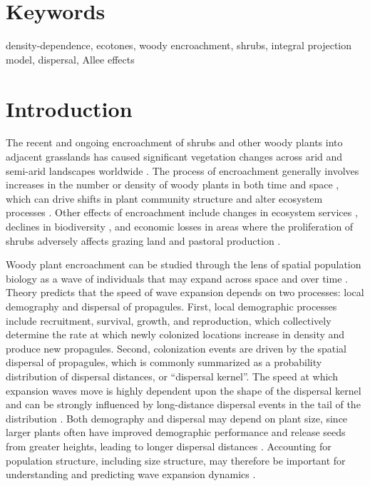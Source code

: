 \documentclass[11pt]{article}\usepackage[]{graphicx}\usepackage[usenames,dvipsnames]{xcolor}
\begin{document}
\section*{Keywords}

density-dependence, ecotones, woody encroachment, shrubs, integral projection model, dispersal, Allee effects

\newpage
\section*{Introduction}
The recent and ongoing encroachment of shrubs and other woody plants into adjacent grasslands has caused significant vegetation changes across arid and semi-arid landscapes worldwide \citep{van2000shrub, van2009causes, goslee2003high, gibbens2005vegetation,parizek2002soil, cabral2003shrub,trollope1989encroachment, roques2001dynamics}.
The process of encroachment generally involves increases in the number or density of woody plants in both time and space \citep{van2000shrub}, which can drive shifts in plant community structure and alter ecosystem processes \citep{schlesinger1990biological, ravi2009can,schlesinger1998plant, knapp2008shrub}.
Other effects of encroachment include changes in ecosystem services \citep{reed2015reorienting, kelleway2017review}, declines in biodiversity \citep{ratajczak2012woody, sirami2012changes, brandt2013regime}, and economic losses in areas where the proliferation of shrubs adversely affects grazing land and pastoral production \citep{mugasi2000economic, oba2000bush}.

Woody plant encroachment can be studied through the lens of spatial population biology as a wave of individuals that may expand across space and over time \citep{kot1996dispersal, neubert2000demography, wang2002integrodifference, pan2012invasion}.
Theory predicts that the speed of wave expansion depends on two processes: local demography and dispersal of propagules.
First, local demographic processes include recruitment, survival, growth, and reproduction, which collectively determine the rate at which newly colonized locations increase in density and produce new propagules. 
Second, colonization events are driven by the spatial dispersal of propagules, which is commonly summarized as a probability distribution of dispersal distances, or ``dispersal kernel''.
The speed at which expansion waves move is highly dependent upon the shape of the dispersal kernel and can be strongly influenced by long-distance dispersal events in the tail of the distribution \citep{skarpaas2007dispersal}.
Both demography and dispersal may depend on plant size, since larger plants often have improved demographic performance and release seeds from greater heights, leading to longer dispersal distances \citep{nathan2011mechanistic}.
Accounting for population structure, including size structure, may therefore be important for understanding and predicting wave expansion dynamics \citep{neubert2000demography}.
\end{document}

